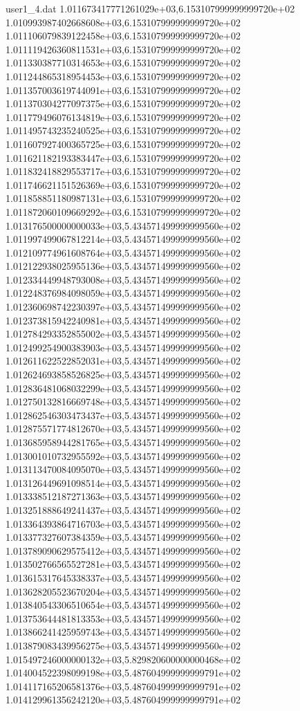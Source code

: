 \begin{filecontents}{user1_4.dat}
1.011673417771261029e+03,6.153107999999999720e+02
1.010993987402668608e+03,6.153107999999999720e+02
1.011106079839122458e+03,6.153107999999999720e+02
1.011119426360811531e+03,6.153107999999999720e+02
1.011330387710314653e+03,6.153107999999999720e+02
1.011244865318954453e+03,6.153107999999999720e+02
1.011357003619744091e+03,6.153107999999999720e+02
1.011370304277097375e+03,6.153107999999999720e+02
1.011779496076134819e+03,6.153107999999999720e+02
1.011495743235240525e+03,6.153107999999999720e+02
1.011607927400365725e+03,6.153107999999999720e+02
1.011621182193383447e+03,6.153107999999999720e+02
1.011832418829553717e+03,6.153107999999999720e+02
1.011746621151526369e+03,6.153107999999999720e+02
1.011858851180987131e+03,6.153107999999999720e+02
1.011872060109669292e+03,6.153107999999999720e+02
1.013176500000000033e+03,5.434571499999999560e+02
1.011997499067812214e+03,5.434571499999999560e+02
1.012109774961608764e+03,5.434571499999999560e+02
1.012122938025955136e+03,5.434571499999999560e+02
1.012334449948793008e+03,5.434571499999999560e+02
1.012248376984098059e+03,5.434571499999999560e+02
1.012360698742230397e+03,5.434571499999999560e+02
1.012373815942240981e+03,5.434571499999999560e+02
1.012784293352855002e+03,5.434571499999999560e+02
1.012499254900383903e+03,5.434571499999999560e+02
1.012611622522852031e+03,5.434571499999999560e+02
1.012624693858526825e+03,5.434571499999999560e+02
1.012836481068032299e+03,5.434571499999999560e+02
1.012750132816669748e+03,5.434571499999999560e+02
1.012862546303473437e+03,5.434571499999999560e+02
1.012875571774812670e+03,5.434571499999999560e+02
1.013685958944281765e+03,5.434571499999999560e+02
1.013001010732955592e+03,5.434571499999999560e+02
1.013113470084095070e+03,5.434571499999999560e+02
1.013126449691098514e+03,5.434571499999999560e+02
1.013338512187271363e+03,5.434571499999999560e+02
1.013251888649241437e+03,5.434571499999999560e+02
1.013364393864716703e+03,5.434571499999999560e+02
1.013377327607384359e+03,5.434571499999999560e+02
1.013789090629575412e+03,5.434571499999999560e+02
1.013502766565527281e+03,5.434571499999999560e+02
1.013615317645338337e+03,5.434571499999999560e+02
1.013628205523670204e+03,5.434571499999999560e+02
1.013840543306510654e+03,5.434571499999999560e+02
1.013753644481813353e+03,5.434571499999999560e+02
1.013866241425959743e+03,5.434571499999999560e+02
1.013879083439956275e+03,5.434571499999999560e+02
1.015497246000000132e+03,5.829820600000000468e+02
1.014004522398099198e+03,5.487604999999999791e+02
1.014117165206581376e+03,5.487604999999999791e+02
1.014129961356242120e+03,5.487604999999999791e+02

\end{filecontents}
